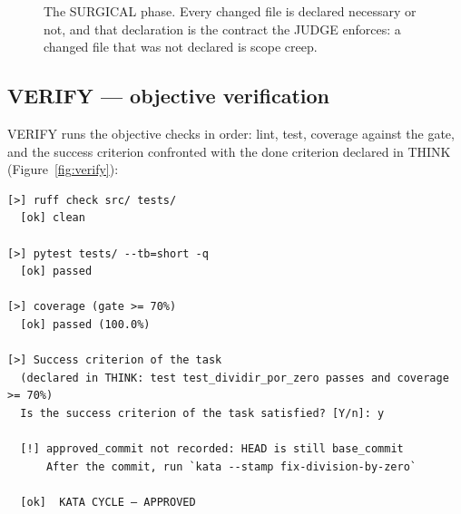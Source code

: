\documentclass{sbc2019}%
\begin{document}
\begin{figure}[!ht]
\centering
{}
\caption{The SURGICAL phase. Every changed file is declared necessary or
not, and that declaration is the contract the JUDGE enforces: a changed
file that was not declared is scope creep.}
\label{fig:surgical}
\end{figure}

\subsection{VERIFY --- objective verification}

VERIFY runs the objective checks in order: lint, test, coverage against the
gate, and the success criterion confronted with the done criterion declared
in THINK (Figure~\ref{fig:verify}):

\begin{lstlisting}
[>] ruff check src/ tests/
  [ok] clean

[>] pytest tests/ --tb=short -q
  [ok] passed

[>] coverage (gate >= 70%)
  [ok] passed (100.0%)

[>] Success criterion of the task
  (declared in THINK: test test_dividir_por_zero passes and coverage >= 70%)
  Is the success criterion of the task satisfied? [Y/n]: y

  [!] approved_commit not recorded: HEAD is still base_commit
      After the commit, run `kata --stamp fix-division-by-zero`

  [ok]  KATA CYCLE — APPROVED
\end{lstlisting}
\end{document}

